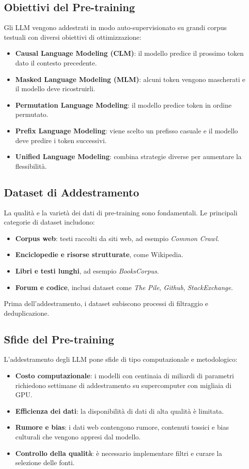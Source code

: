 \subsection{Obiettivi del Pre-training}
Gli LLM vengono addestrati in modo auto-supervisionato su grandi corpus testuali con diversi obiettivi di ottimizzazione:
\begin{itemize}
    \item \textbf{Causal Language Modeling (CLM)}: il modello predice il prossimo token dato il contesto precedente. 
    \item \textbf{Masked Language Modeling (MLM)}: alcuni token vengono mascherati e il modello deve ricostruirli.
    \item \textbf{Permutation Language Modeling}: il modello predice token in ordine permutato.
    \item \textbf{Prefix Language Modeling}: viene scelto un prefisso casuale e il modello deve predire i token successivi.
    \item \textbf{Unified Language Modeling}: combina strategie diverse per aumentare la flessibilità.
\end{itemize}

\subsection{Dataset di Addestramento}
La qualità e la varietà dei dati di pre-training sono fondamentali. Le principali categorie di dataset includono:
\begin{itemize}
    \item \textbf{Corpus web}: testi raccolti da siti web, ad esempio \textit{Common Crawl}.
    \item \textbf{Enciclopedie e risorse strutturate}, come Wikipedia.
    \item \textbf{Libri e testi lunghi}, ad esempio \textit{BooksCorpus}.
    \item \textbf{Forum e codice}, inclusi dataset come \textit{The Pile}, \textit{Github}, \textit{StackExchange}.
\end{itemize}
Prima dell'addestramento, i dataset subiscono processi di filtraggio e deduplicazione.

\subsection{Sfide del Pre-training}
L'addestramento degli LLM pone sfide di tipo computazionale e metodologico:
\begin{itemize}
    \item \textbf{Costo computazionale}: i modelli con centinaia di miliardi di parametri richiedono settimane di addestramento su supercomputer 
    con migliaia di GPU.
    \item \textbf{Efficienza dei dati}: la disponibilità di dati di alta qualità è limitata.
    \item \textbf{Rumore e bias}: i dati web contengono rumore, contenuti tossici e bias culturali che vengono appresi dal modello.
    \item \textbf{Controllo della qualità}: è necessario implementare filtri e curare la selezione delle fonti.
\end{itemize}

